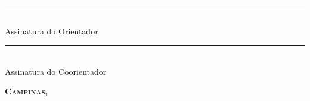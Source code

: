 \noindent
{\small \bfseries
\rule[1pt]{8.5cm}{.5pt}\\  %
Assinatura do Orientador
}
\vspace{1cm}

\noindent
{\small \bfseries
\rule[1pt]{8.5cm}{.5pt}\\  %
Assinatura do Coorientador
}
\vspace{1cm}
\begin{center}
    {\small \scshape \bfseries Campinas, \ano}
\end{center}
